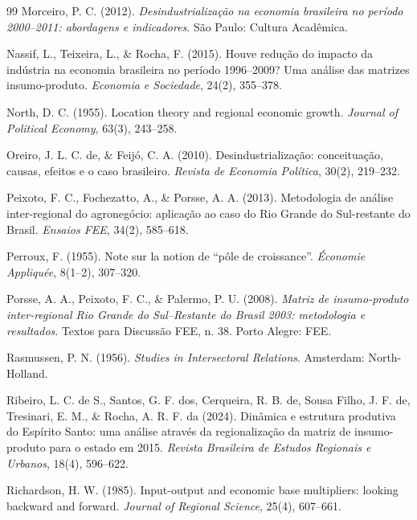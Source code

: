 \documentclass[11pt,a4paper]{article}
\begin{document}
\begin{thebibliography}{99}
Morceiro, P. C. (2012). \textit{Desindustrialização na economia brasileira no período
2000--2011: abordagens e indicadores}. São Paulo: Cultura Acadêmica.

Nassif, L., Teixeira, L., \& Rocha, F. (2015). Houve redução do impacto da indústria na
economia brasileira no período 1996--2009? Uma análise das matrizes insumo-produto.
\textit{Economia e Sociedade}, 24(2), 355--378.

North, D. C. (1955). Location theory and regional economic growth. \textit{Journal of
Political Economy}, 63(3), 243--258.

Oreiro, J. L. C. de, \& Feijó, C. A. (2010). Desindustrialização: conceituação, causas,
efeitos e o caso brasileiro. \textit{Revista de Economia Política}, 30(2), 219--232.

Peixoto, F. C., Fochezatto, A., \& Porsse, A. A. (2013). Metodologia de análise
inter-regional do agronegócio: aplicação ao caso do Rio Grande do Sul-restante do
Brasil. \textit{Ensaios FEE}, 34(2), 585--618.

Perroux, F. (1955). Note sur la notion de ``pôle de croissance''. \textit{Économie
Appliquée}, 8(1--2), 307--320.

Porsse, A. A., Peixoto, F. C., \& Palermo, P. U. (2008). \textit{Matriz de
insumo-produto inter-regional Rio Grande do Sul--Restante do Brasil 2003: metodologia
e resultados}. Textos para Discussão FEE, n. 38. Porto Alegre: FEE.

Rasmussen, P. N. (1956). \textit{Studies in Intersectoral Relations}. Amsterdam:
North-Holland.

Ribeiro, L. C. de S., Santos, G. F. dos, Cerqueira, R. B. de, Sousa Filho, J. F. de,
Tresinari, E. M., \& Rocha, A. R. F. da (2024). Dinâmica e estrutura produtiva do Espírito
Santo: uma análise através da regionalização da matriz de insumo-produto para o estado em 2015.
\textit{Revista Brasileira de Estudos Regionais e Urbanos}, 18(4), 596--622.

Richardson, H. W. (1985). Input-output and economic base multipliers: looking backward
and forward. \textit{Journal of Regional Science}, 25(4), 607--661.


\end{thebibliography}
\end{document}
